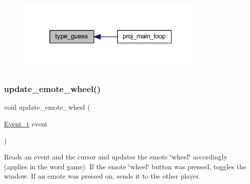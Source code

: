 \begin{figure}[H]
\begin{center}
\leavevmode
\includegraphics[width=265pt]{group__pengoo_gabe23d2dac0552bf9069a47573770d379_icgraph}
\end{center}
\end{figure}
\mbox{\label{group__pengoo_ga60a599fe4cffb804d5375495cdc35d9c}} 
\subsubsection{\texorpdfstring{update\+\_\+emote\+\_\+wheel()}{update\_emote\_wheel()}}
{\footnotesize\ttfamily void update\+\_\+emote\+\_\+wheel (\begin{DoxyParamCaption}\item[{\mbox{\hyperlink{struct_event__t}{Event\+\_\+t}}}]{event }\end{DoxyParamCaption})}



Reads an event and the cursor and updates the emote \char`\"{}wheel\char`\"{} accordingly (applies in the word game). If the emote \char`\"{}wheel\char`\"{} button was pressed, toggles the window. If an emote was pressed on, sends it to the other player. 


